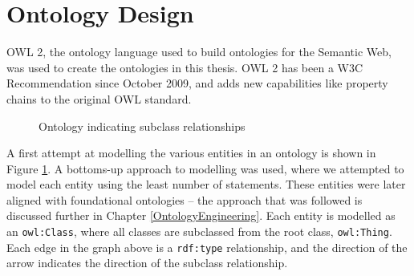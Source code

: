 



\section{Ontology Design}
\label{OntologyDesign1}

\ac{OWL} 2, the ontology language used to build ontologies for the Semantic Web, was used to create the ontologies in this thesis. \ac{OWL} 2 has been a W3C Recommendation since October 2009, and adds new capabilities like property chains to the original \ac{OWL} standard. %

\begin{figure}[bth]
	\caption{Ontology indicating subclass relationships}
	\label{ontology1}
\end{figure}


A first attempt at modelling the various entities in an ontology is shown in Figure \ref{ontology1}. A bottoms-up approach to modelling was used, where we attempted to model each entity using the least number of statements. These entities were later aligned with foundational ontologies -- the approach that was followed is discussed further in Chapter \ref{OntologyEngineering}. Each entity is modelled as an \texttt{owl:Class}, where all classes are subclassed from the root class, \texttt{owl:Thing}. Each edge in the graph above is a \texttt{rdf:type} relationship, and the direction of the arrow indicates the direction of the subclass relationship.

